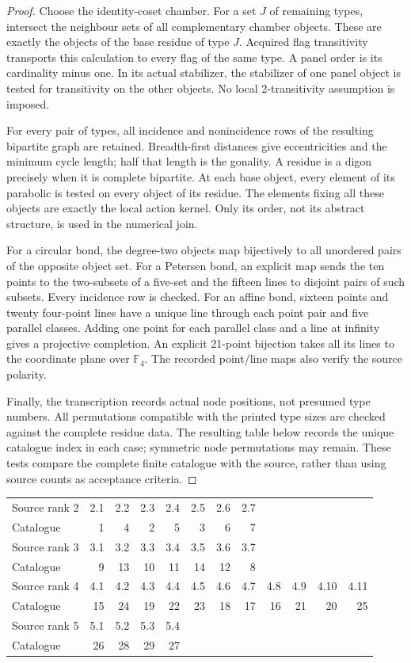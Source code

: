 \documentclass[10pt]{article}
\begin{document}
\begin{proof}
Choose the identity-coset chamber.  For a set $J$ of remaining types, intersect
the neighbour sets of all complementary chamber objects.  These are exactly
the objects of the base residue of type $J$.  Acquired flag transitivity
transports this calculation to every flag of the same type.  A panel order is
its cardinality minus one.  In its actual stabilizer, the stabilizer of one
panel object is tested for transitivity on the other objects.  No local
$2$-transitivity assumption is imposed.

For every pair of types, all incidence and nonincidence rows of the resulting
bipartite graph are retained.  Breadth-first distances give eccentricities and
the minimum cycle length; half that length is the gonality.  A residue is a
digon precisely when it is complete bipartite.  At each base object, every
element of its parabolic is tested on every object of its residue.  The
elements fixing all these objects are exactly the local action kernel.
Only its order, not its abstract structure, is used in the numerical join.

For a circular bond, the degree-two objects map bijectively to all unordered
pairs of the opposite object set.  For a Petersen bond, an explicit map sends
the ten points to the two-subsets of a five-set and the fifteen lines to
disjoint pairs of such subsets.  Every incidence row is checked.  For an
affine bond, sixteen points and twenty four-point lines have a unique line
through each point pair and five parallel classes.  Adding one point for each
parallel class and a line at infinity gives a projective completion.  An
explicit 21-point bijection takes all its lines to the coordinate plane over
$\mathbb F_4$.  The recorded point/line maps also verify the source polarity.

Finally, the transcription records actual node positions, not presumed type
numbers.  All permutations compatible with the printed type sizes are checked
against the complete residue data.  The resulting table below records the
unique catalogue index in each case; symmetric node permutations may remain.
These tests compare the complete finite catalogue with the source, rather
than using source counts as acceptance criteria.
\end{proof}

\begin{center}\small
\begin{tabular}{@{}lrrrrrrrrrrr@{}}\toprule
Source rank 2 &2.1&2.2&2.3&2.4&2.5&2.6&2.7\\
Catalogue &1&4&2&5&3&6&7\\\midrule
Source rank 3 &3.1&3.2&3.3&3.4&3.5&3.6&3.7\\
Catalogue &9&13&10&11&14&12&8\\\midrule
Source rank 4 &4.1&4.2&4.3&4.4&4.5&4.6&4.7&4.8&4.9&4.10&4.11\\
Catalogue &15&24&19&22&23&18&17&16&21&20&25\\\midrule
Source rank 5 &5.1&5.2&5.3&5.4\\
Catalogue &26&28&29&27\\\bottomrule
\end{tabular}
\end{center}
\end{document}
